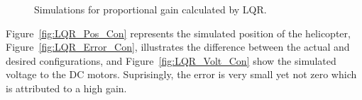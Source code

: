 \begin{figure}[!htbp]
    \centering
    \caption{Simulations for proportional gain calculated by LQR.}
\end{figure}
Figure~\ref{fig:LQR_Pos_Con} represents the simulated position of the helicopter, Figure~\ref{fig:LQR_Error_Con}, illustrates the difference between the actual and desired configurations, and Figure~\ref{fig:LQR_Volt_Con} show the simulated voltage to the DC motors.  Suprisingly, the error is very small yet not zero which is attributed to a high gain.

